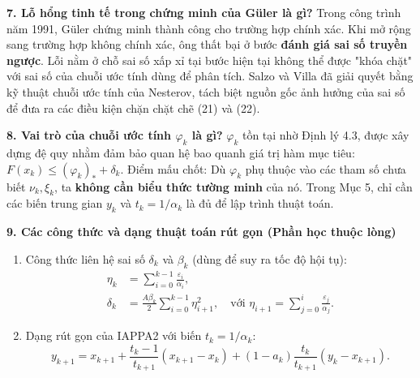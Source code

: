 ﻿\documentclass[12pt]{article}
\begin{document}
\textbf{7. Lỗ hổng tinh tế trong chứng minh của Güler là gì?}
Trong công trình năm 1991, Güler chứng minh thành công cho trường hợp chính xác. Khi mở rộng sang trường hợp không chính xác, ông thất bại ở bước \textbf{đánh giá sai số truyền ngược}. Lỗi nằm ở chỗ sai số xấp xỉ tại bước hiện tại không thể được "khóa chặt" với sai số của chuỗi ước tính dùng để phân tích.
Salzo và Villa đã giải quyết bằng kỹ thuật chuỗi ước tính của Nesterov, tách biệt nguồn gốc ảnh hưởng của sai số để đưa ra các điều kiện chặn chặt chẽ (21) và (22).

\textbf{8. Vai trò của chuỗi ước tính \(\varphi_k\) là gì?}
\(\varphi_k\) tồn tại nhờ Định lý 4.3, được xây dựng đệ quy nhằm đảm bảo quan hệ bao quanh giá trị hàm mục tiêu: \(F(x_k) \le (\varphi_k)_* + \delta_k\).
Điểm mấu chốt: Dù \(\varphi_k\) phụ thuộc vào các tham số chưa biết \(\nu_k, \xi_k\), ta \textbf{không cần biểu thức tường minh} của nó. Trong Mục 5, chỉ cần các biến trung gian \(y_k\) và \(t_k = 1/\alpha_k\) là đủ để lập trình thuật toán.

\textbf{9. Các công thức và dạng thuật toán rút gọn (Phần học thuộc lòng)}
\begin{enumerate}
    \item Công thức liên hệ sai số \(\delta_k\) và \(\beta_k\) (dùng để suy ra tốc độ hội tụ):
    \begin{align*}
        \eta_k &= \sum_{i=0}^{k-1} \frac{\varepsilon_i}{\alpha_i},\\
        \delta_k &= \frac{A\beta_k}{2} \sum_{i=0}^{k-1} \eta_{i+1}^2, \quad \text{với } \eta_{i+1} = \sum_{j=0}^{i} \frac{\varepsilon_j}{\alpha_j}. \tag{15}
    \end{align*}

    \item Dạng rút gọn của IAPPA2 với biến \(t_k = 1/\alpha_k\):
    \begin{equation*}
        y_{k+1} = x_{k+1} + \frac{t_k - 1}{t_{k+1}}(x_{k+1} - x_k) + (1-a_k)\frac{t_k}{t_{k+1}}(y_k - x_{k+1}).
    \end{equation*}
\end{enumerate}
\end{document}
